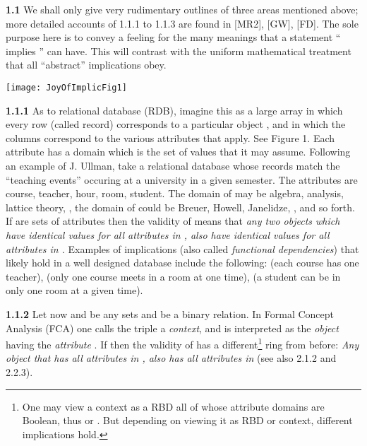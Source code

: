 \documentclass[11pt]{article}
\begin{document}
{\bf 1.1} We shall only give very rudimentary outlines of three areas mentioned above; more detailed accounts of 1.1.1 to 1.1.3 are found in [MR2], [GW], [FD].  The sole purpose here is to convey a feeling for the many meanings that a statement `` implies '' can have. This will contrast with the uniform mathematical treatment that all ``abstract'' implications  obey.

\begin{center}
\texttt{[image: JoyOfImplicFig1]}
\end{center}

{\bf 1.1.1} As to relational database (RDB), imagine this as a large array in which every row (called record) corresponds to a particular object , and in which the columns correspond to the various attributes  
that apply. See Figure 1. Each attribute has a domain which is the set of values that it may assume. Following an example of J. Ullman, take a relational database whose records match the ``teaching events'' occuring at a university in a given semester. The attributes are  course,  teacher,  hour,  room,  student. The domain of  may be algebra, analysis, lattice theory, , the domain of  could be Breuer, Howell, Janelidze, , and so forth. If  are sets of attributes then the validity of   means that {\it any two objects which have identical values for all attributes in , also have identical values for all attributes in .} Examples of implications  (also called {\it functional dependencies}) that likely hold in a well designed database include the following:  (each course has one teacher),  (only one course meets in a room at one time),  (a student can be in only one room at a given time).

{\bf 1.1.2} Let now  and  be any sets and  be a binary relation. In Formal Concept Analysis (FCA) one calls the triple  a {\it context}, and  is interpreted as the {\it object}  having the {\it attribute} . If  then the validity of   has a different\footnote{One may view a context as a RBD all of whose attribute domains are Boolean, thus  or . But depending on viewing it as RBD or context, different implications hold.} ring from before:  {\it Any object that has all attributes in , also has all attributes in } (see also 2.1.2 and 2.2.3). 
\end{document}
